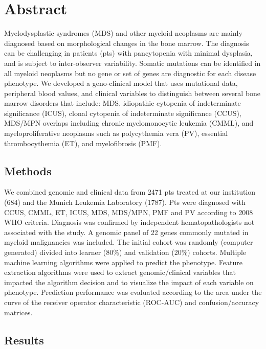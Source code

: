 \section{Abstract}%

Myelodysplastic syndromes (MDS) and other myeloid neoplasms are mainly diagnosed based on morphological changes in the bone marrow. The diagnosis can be challenging in patients (pts) with pancytopenia with minimal dysplasia, and is subject to inter-observer variability. Somatic mutations can be identified in all myeloid neoplasms but no gene or set of genes are diagnostic for each disease phenotype. 
We developed a geno-clinical model that uses mutational data, peripheral blood values, and clinical variables to distinguish between several bone marrow disorders that include: MDS, idiopathic cytopenia of indeterminate significance (ICUS), clonal cytopenia of indeterminate significance (CCUS), MDS/MPN overlaps including chronic myelomonocytic leukemia (CMML), and myeloproliferative neoplasms such as polycythemia vera (PV), essential thrombocythemia (ET), and myelofibrosis (PMF).


\subsection{Methods}%

We combined genomic and clinical data from 2471 pts treated at our institution (684) and the Munich Leukemia Laboratory (1787). Pts were diagnosed with CCUS, CMML, ET, ICUS, MDS, MDS/MPN, PMF and PV according to 2008 WHO criteria. Diagnosis was confirmed by independent hematopathologists not associated with the study. A genomic panel of 22 genes commonly mutated in myeloid malignancies was included. The initial cohort was randomly (computer generated) divided into learner (80\%) and validation (20\%) cohorts. Multiple machine learning algorithms were applied to predict the phenotype. Feature extraction algorithms were used to extract genomic/clinical variables that impacted the algorithm decision and to visualize the impact of each variable on phenotype. Prediction performance was evaluated according to the area under the curve of the receiver operator characteristic (ROC-AUC) and confusion/accuracy matrices.


\subsection{Results}%

